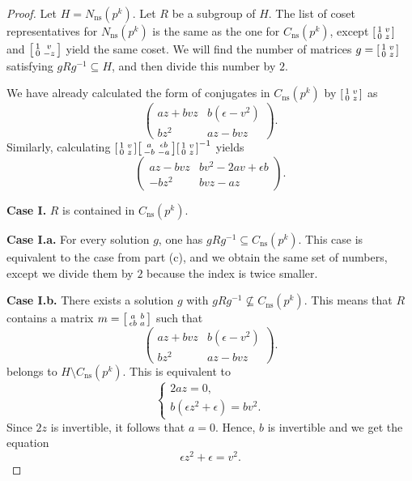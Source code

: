 \documentclass[10pt,leqno]{amsart}
\newcommand\sm[1]{\begin{bsmallmatrix}#1\end{bsmallmatrix}}
\theoremstyle{definition}
\theoremstyle{remark}
\numberwithin{theorem}{section}
\begin{document}
\begin{proof}
    Let $H=N_{\mathrm{ns}}(p^k)$. Let $R$ be a subgroup of $H$. The list of coset representatives for $N_{\mathrm{ns}}(p^k)$ is the same as the one for $C_{\mathrm{ns}}(p^k)$, except $\sm{1 & v \\ 0 & z}$ and $\sm{1 & v \\ 0 & -z}$ yield the same coset. We will find the number of matrices $g=\sm{1 & v \\ 0 & z}$ satisfying $gRg^{-1}\subseteq H$, and then divide this number by $2$.
    
   We have already calculated the form of conjugates in $C_{\mathrm{ns}}(p^k)$ by $\sm{1 & v \\ 0 & z}$ as 
    $$\begin{pmatrix} az+bvz & b(\epsilon - v^2) \\
bz^2 & az-bvz\end{pmatrix}.$$
Similarly, calculating $\sm{1 & v \\0 & z}\sm{a & \epsilon b \\ -b  & -a}\sm{1 & v \\ 0 & z}^{-1}$ yields 
  $$\begin{pmatrix} az-bvz & bv^2-2av+\epsilon b \\
-bz^2 & bvz-az\end{pmatrix}.$$

\noindent \textbf{Case I.} $R$ is contained in $C_{\mathrm{ns}}(p^k)$. 

\noindent \textbf{Case I.a.} For every solution $g$, one has $gRg^{-1}\subseteq C_{\mathrm{ns}}(p^k)$. This case is equivalent to the case from part (c), and we obtain the same set of numbers, except we divide them by $2$ because the index is twice smaller.

\noindent \textbf{Case I.b.} There exists a solution $g$ with $gRg^{-1}\not \subseteq C_{\mathrm{ns}}(p^k)$. This means that $R$ contains a matrix $m=\sm{a & b \\ \epsilon b & a}$ such that  $$\begin{pmatrix} az+bvz & b(\epsilon - v^2) \\
bz^2 & az-bvz\end{pmatrix}.$$ belongs to $H\setminus C_{\mathrm{ns}}(p^k)$. This is equivalent to 
\[
\begin{cases}
2az=0, \\[4pt]
b(\epsilon z^2+\epsilon)=bv^2.
\end{cases}
\]
Since $2z$ is invertible, it follows that $a=0$. Hence, $b$ is invertible and we get the equation \begin{equation} \label{bla1}\epsilon z^2+\epsilon=v^2.\end{equation}


\end{proof}
\end{document}
